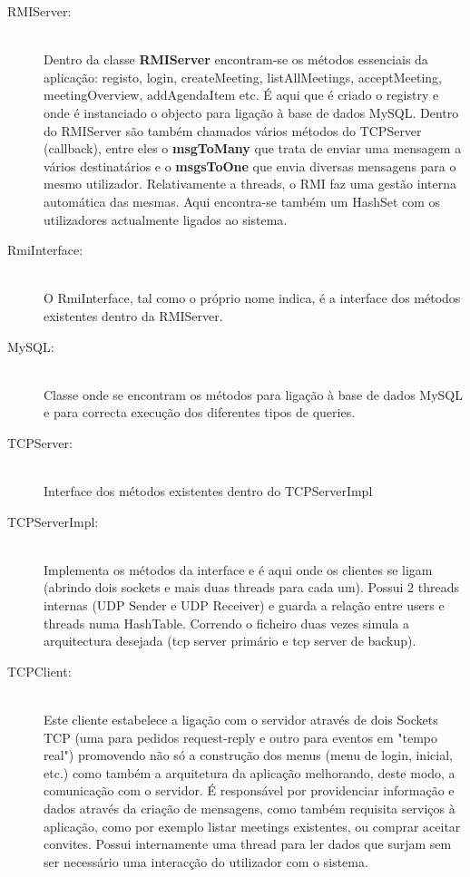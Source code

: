 \documentclass[12pt]{article} %
\begin{document}
\begin{description}
	\item[RMIServer:] \hfill \\
	Dentro da classe \textbf{RMIServer} encontram-se os métodos essenciais da aplicação: registo, login, createMeeting, listAllMeetings, acceptMeeting, meetingOverview, addAgendaItem etc. É aqui que é criado o registry e onde é instanciado o objecto para ligação à base de dados MySQL. Dentro do RMIServer são também chamados vários métodos do TCPServer (callback), entre eles o \textbf{msgToMany} que trata de enviar uma mensagem a vários destinatários e o \textbf{msgsToOne} que envia diversas mensagens para o mesmo utilizador. Relativamente a threads, o RMI faz uma gestão interna automática das mesmas.
	Aqui encontra-se também um HashSet com os utilizadores actualmente ligados ao sistema.
	\item[RmiInterface:] \hfill \\
	O RmiInterface, tal como o próprio nome indica, é a interface dos métodos existentes dentro da RMIServer.
	\item[MySQL:] \hfill \\
	Classe onde se encontram os métodos para ligação à base de dados MySQL e para correcta execução dos diferentes tipos de queries.
	\item[TCPServer:] \hfill \\
	Interface dos métodos existentes dentro do TCPServerImpl
	\item[TCPServerImpl:] \hfill \\
	Implementa os métodos da interface e é aqui onde os clientes se ligam (abrindo dois sockets e mais duas threads para cada um). Possui 2 threads internas (UDP Sender e UDP Receiver) e guarda a relação entre users e threads numa HashTable. Correndo o ficheiro duas vezes simula a arquitectura desejada (tcp server primário e tcp server de backup).	
	\item[TCPClient:] \hfill \\
	Este cliente estabelece a ligação com o servidor através de dois Sockets TCP (uma para pedidos request-reply e outro para eventos em "tempo real") promovendo não só a construção dos menus (menu de login, inicial, etc.) como também a arquitetura da aplicação melhorando, deste modo, a comunicação com o servidor. É responsável por providenciar informação e dados através da criação de mensagens, como também requisita serviços à aplicação, como por exemplo listar meetings existentes, ou comprar aceitar convites.
	Possui internamente uma thread para ler dados que surjam sem ser necessário uma interacção do utilizador com o sistema.

\end{description}
\end{document}
